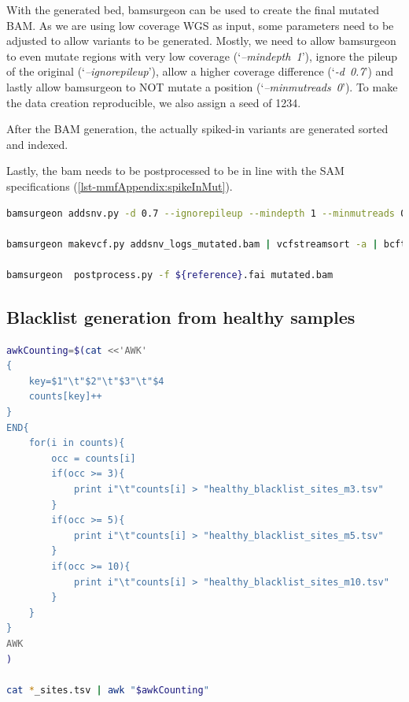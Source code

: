 With the generated bed, bamsurgeon can be used to create the final mutated BAM. As we are using low coverage WGS as input, some parameters need to be adjusted to allow variants to be generated. Mostly, we need to allow bamsurgeon to even mutate regions with very low coverage (\lq\emph{--mindepth~1}\rq), ignore the pileup of the original (\lq\emph{--ignorepileup}\rq), allow a higher coverage difference (\lq\emph{-d~0.7}\rq) and lastly allow bamsurgeon to NOT mutate a position (\lq\emph{--minmutreads~0}\rq). To make the data creation reproducible, we also assign a seed of 1234.

After the BAM generation, the actually spiked-in variants are generated sorted and indexed.

Lastly, the bam needs to be postprocessed to be in line with the SAM specifications (\autoref{lst-mmfAppendix:spikeInMut}).

\begin{lstlisting}[language=bash, caption=bamsurgeon spike-in, label={lst-mmfAppendix:spikeInMut}]
bamsurgeon addsnv.py -d 0.7 --ignorepileup --mindepth 1 --minmutreads 0 -v mutations.bed -r $reference -o mutated.bam --aligner mem --seed 1234 -f input.bam

bamsurgeon makevcf.py addsnv_logs_mutated.bam | vcfstreamsort -a | bcftools view -o variants.vcf.gz -O z && bcftools index -t variants.vcf.gz

bamsurgeon  postprocess.py -f ${reference}.fai mutated.bam
\end{lstlisting}


\subsection{Blacklist generation from healthy samples}

\begin{lstlisting}[language=bash, caption=Blacklist postprocessing, label={lst-mmf:blacklist}]
awkCounting=$(cat <<'AWK'
{
    key=$1"\t"$2"\t"$3"\t"$4
    counts[key]++
}
END{
    for(i in counts){
        occ = counts[i]
        if(occ >= 3){
            print i"\t"counts[i] > "healthy_blacklist_sites_m3.tsv"
        }
        if(occ >= 5){
            print i"\t"counts[i] > "healthy_blacklist_sites_m5.tsv"
        }
        if(occ >= 10){
            print i"\t"counts[i] > "healthy_blacklist_sites_m10.tsv"
        }
    }
}
AWK
)

cat *_sites.tsv | awk "$awkCounting"
\end{lstlisting}



